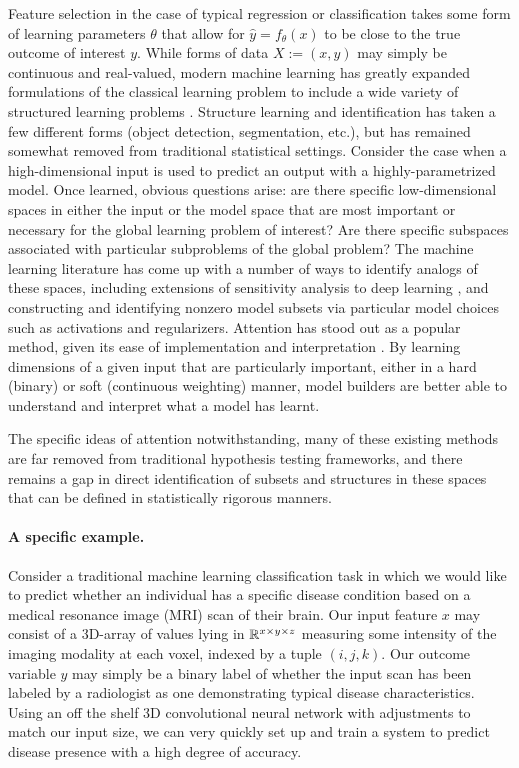 Feature selection in the case of typical regression or classification
takes some form of learning parameters $\theta$ that allow for $\hat{y} = f_\theta(x)$ to be close to the true outcome of interest $y$.
While forms of data $X := (x,y)$ may simply be continuous and real-valued, modern machine learning has greatly expanded formulations of the classical learning problem to include a wide variety of structured learning problems \citep{nowozin2011structured}. 
Structure learning and identification has taken a few different forms (object detection, segmentation, etc.),
but has remained somewhat removed from traditional
statistical settings.
Consider the case when a high-dimensional input is used to predict an output with a highly-parametrized model. 
Once learned, obvious questions arise: are there specific low-dimensional spaces in either the input or the model space that are most important or necessary for the global learning problem of interest? Are there specific subspaces associated with particular subproblems of the global problem?
The machine learning literature has come up with a number of ways to identify analogs of these spaces, including extensions of sensitivity analysis to deep learning \citep{yeung2010sensitivity,zhang2015sensitivity}, and constructing and identifying nonzero model subsets via particular model choices such as activations \citep{selvaraju2017grad} and regularizers.
Attention has stood out as a popular method,
given its ease of implementation and interpretation \citep{sutskever2014sequence,vaswani2017attention}.
By learning dimensions of a given input that are particularly important, either in a hard (binary) or soft (continuous weighting) manner, model builders are better able to understand and interpret what a model has learnt.

The specific ideas of attention notwithstanding, many of these existing methods are far removed from traditional hypothesis testing frameworks, and
there remains a gap in direct identification of subsets and structures in these spaces that can be defined in statistically rigorous manners.

\paragraph{A specific example.} Consider a traditional machine learning classification task in which we would like to predict whether an individual has a specific disease condition based on a medical resonance image (MRI) scan of their brain. Our input feature $x$ may consist of a 3D-array of values lying in $\mathbb{R}^{x\times y\times z}$ measuring some intensity of the imaging modality at each voxel, indexed by a tuple $(i,j,k)$.
Our outcome variable $y$ may simply be a binary label of whether the input scan has been labeled by a radiologist as one demonstrating typical disease characteristics.
Using an off the shelf 3D convolutional neural network with adjustments to match our input size, we can very quickly set up and train a system to predict disease presence with a high degree of accuracy.

